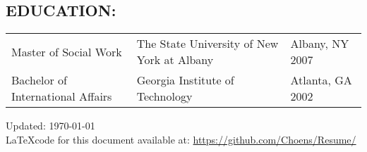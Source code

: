 \documentclass[line, mm, 10pt]{res}
\begin{document}
\begin{resume}
  \section{EDUCATION:}
  \begin{tabular} {p{2.25in} p{2.75in} p{2in}}
    Master of Social Work & The State University of New  York at Albany & Albany, NY 2007 \\
    Bachelor of International Affairs & Georgia Institute of Technology & Atlanta, GA 2002 \\
  \end{tabular}


\end{resume}

\vspace{.25in}
Updated: \today \\
\LaTeX code for this document available at:
\href{https://github.com/Choens/Resume/}{https://github.com/Choens/Resume/}
\end{document}

